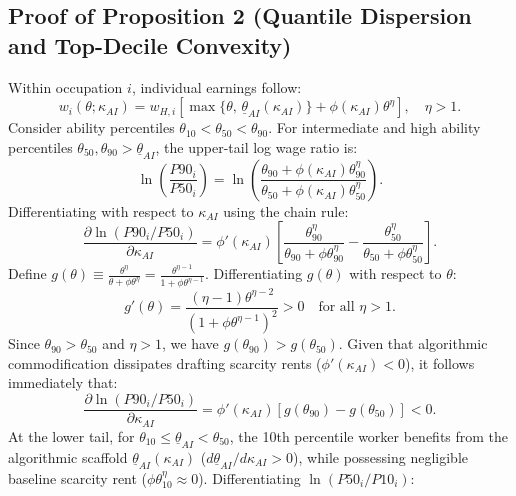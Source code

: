\documentclass[12pt]{article}
\begin{document}
\subsection{Proof of Proposition 2 (Quantile Dispersion and Top-Decile Convexity)}

Within occupation $i$, individual earnings follow:
\begin{equation}
w_i(\theta; \kappa_{AI}) = w_{H, i} \left[ \max\{\theta, \, \underline{\theta}_{AI}(\kappa_{AI})\} + \phi(\kappa_{AI}) \theta^\eta \right], \quad \eta > 1.
\end{equation}
Consider ability percentiles $\theta_{10} < \theta_{50} < \theta_{90}$. For intermediate and high ability percentiles $\theta_{50}, \theta_{90} > \underline{\theta}_{AI}$, the upper-tail log wage ratio is:
\begin{equation}
\ln \left( \frac{P90_i}{P50_i} \right) = \ln \left( \frac{\theta_{90} + \phi(\kappa_{AI}) \theta_{90}^\eta}{\theta_{50} + \phi(\kappa_{AI}) \theta_{50}^\eta} \right).
\end{equation}
Differentiating with respect to $\kappa_{AI}$ using the chain rule:
\begin{equation}
\frac{\partial \ln (P90_i / P50_i)}{\partial \kappa_{AI}} = \phi'(\kappa_{AI}) \left[ \frac{\theta_{90}^\eta}{\theta_{90} + \phi \theta_{90}^\eta} - \frac{\theta_{50}^\eta}{\theta_{50} + \phi \theta_{50}^\eta} \right].
\end{equation}
Define $g(\theta) \equiv \frac{\theta^\eta}{\theta + \phi \theta^\eta} = \frac{\theta^{\eta - 1}}{1 + \phi \theta^{\eta - 1}}$. Differentiating $g(\theta)$ with respect to $\theta$:
\begin{equation}
g'(\theta) = \frac{(\eta - 1) \theta^{\eta - 2}}{(1 + \phi \theta^{\eta - 1})^2} > 0 \quad \text{for all } \eta > 1.
\end{equation}
Since $\theta_{90} > \theta_{50}$ and $\eta > 1$, we have $g(\theta_{90}) > g(\theta_{50})$. Given that algorithmic commodification dissipates drafting scarcity rents ($\phi'(\kappa_{AI}) < 0$), it follows immediately that:
\begin{equation}
\frac{\partial \ln (P90_i / P50_i)}{\partial \kappa_{AI}} = \phi'(\kappa_{AI}) [g(\theta_{90}) - g(\theta_{50})] < 0.
\end{equation}
At the lower tail, for $\theta_{10} \le \underline{\theta}_{AI} < \theta_{50}$, the 10th percentile worker benefits from the algorithmic scaffold $\underline{\theta}_{AI}(\kappa_{AI})$ ($d\underline{\theta}_{AI}/d\kappa_{AI} > 0$), while possessing negligible baseline scarcity rent ($\phi \theta_{10}^\eta \approx 0$). Differentiating $\ln(P50_i / P10_i)$:
\end{document}
